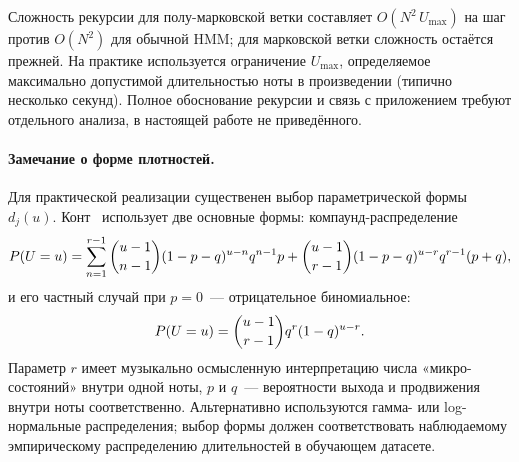 Сложность рекурсии для полу-марковской ветки
составляет $O(N^2\,U_{\max})$ на шаг против $O(N^2)$ для
обычной HMM; для марковской ветки сложность остаётся
прежней. На практике используется ограничение $U_{\max}$,
определяемое максимально допустимой длительностью ноты в
произведении (типично несколько секунд). Полное обоснование
рекурсии и связь с приложением \cite[Appendix~B]{Cont2010}
требуют отдельного анализа, в настоящей работе не приведённого.

\paragraph*{Замечание о форме плотностей.} Для практической
реализации существенен выбор параметрической формы
$d_j(u)$. Конт~\cite[\S~II-C]{Cont2010} использует две основные
формы: компаунд-распределение
\begin{equation}
P(U=u) = \sum_{n=1}^{r-1}\binom{u-1}{n-1}(1-p-q)^{u-n}q^{n-1}p
+ \binom{u-1}{r-1}(1-p-q)^{u-r}q^{r-1}(p+q),
\eqlab{compound-occupancy}
\end{equation}
и его частный случай при $p=0$~--- отрицательное
биномиальное:
\begin{equation}
P(U=u) = \binom{u-1}{r-1}q^r(1-q)^{u-r}.
\eqlab{negative-binomial}
\end{equation}
Параметр $r$ имеет музыкально осмысленную интерпретацию
числа «микро-состояний» внутри одной ноты, $p$ и $q$~---
вероятности выхода и продвижения внутри ноты соответственно.
Альтернативно используются гамма- или log-нормальные
распределения; выбор формы должен соответствовать наблюдаемому
эмпирическому распределению длительностей в обучающем
датасете.
